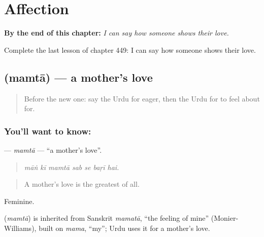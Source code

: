 
\chapter{Affection}
\label{ch:ur-affection}

\begin{chapteropening}
\textbf{By the end of this chapter:} \emph{I can say how someone shows their love.}

Complete the last lesson of chapter 449: I can say how someone shows their love.
\end{chapteropening}

\section[\texorpdfstring{\ur{ممتا} (mamtā)}{ممتا (mamtā)}]{ (mamtā) — a mother's love}

\label{lesson:UR-C449-mamta}



\begin{quote}
Before the new one: say the Urdu for eager, then the Urdu for to feel about for.
\end{quote}

\subsection*{You'll want to know: }
\textbf{} — \emph{mamtā} — \textquotedblleft{}a mother's love\textquotedblright{}.

\begin{quote}
      
\end{quote}

\begin{quote}
\emph{māṅ kī mamtā sab se baṛī hai.}
\end{quote}

\begin{quote}
A mother's love is the greatest of all.
\end{quote}

Feminine.

\begin{cousinweb}
\textbf{} (\emph{mamtā}) is inherited from Sanskrit \emph{mamatā}, \textquotedblleft{}the feeling of mine\textquotedblright{} (Monier-Williams), built on \emph{mama}, \textquotedblleft{}my\textquotedblright{}; Urdu uses it for a mother's love.
\end{cousinweb}

